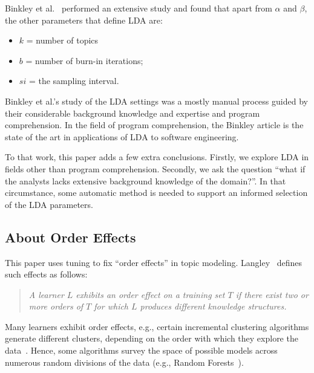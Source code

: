 \documentclass[twocolumn,5p,sort&compress]{elsarticle}
\newcommand{\bi}{\begin{itemize}}
\newcommand{\ei}{\end{itemize}}
\theoremstyle{break}
\begin{document}
Binkley et al.~\cite{binkley2014understanding} performed an extensive study and found that 
apart from $\alpha$ and $\beta$, the other parameters that define LDA
are: 
\bi
    \item $k$ = number of topics
    \item $b$ = number of burn-in iterations;
    \item $si$ = the sampling interval.
\ei
\noindent
Binkley et al.'s study of the LDA settings was a mostly manual process
guided by their considerable background knowledge and expertise and program
comprehension.
In the field of program comprehension, the Binkley article
is the state of the art in applications of LDA to software engineering.

To that work, this paper adds a few extra conclusions.
Firstly, we explore LDA in fields other than program comprehension.
Secondly, we ask the question ``what if the analysts lacks extensive background knowledge
of the domain?''. In that circumstance, some automatic method is needed to support
an informed selection of the LDA parameters.

 


\subsection{About Order Effects}

\noindent
This paper uses tuning to fix ``order effects'' in topic modeling. Langley~\cite{gennari1989models} defines such effects as follows:
\begin{quote}
{\em A learner $L$ exhibits an order effect on a training set  $T$ if there exist
two or more orders of $T$ for which $L$ produces different knowledge structures.}
\end{quote}
Many learners exhibit order effects, e.g., certain incremental clustering algorithms generate different
clusters, depending on the order with which they explore the data~\cite{gennari1989models}.
Hence, some algorithms survey the space of possible models across numerous
random divisions of the data (e.g., Random Forests~\cite{Breiman2001}).
\end{document}
